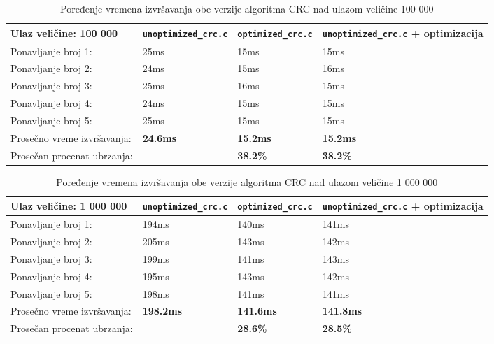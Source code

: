 \documentclass[12pt,oneside]{memoir}
\begin{document}
\begin{table}[!ht]
\begin{center}
\begin{tabular}{ | m{5.5cm} | m{2.7cm}| m{2.5cm} | m{2.7cm} | }
      \hline
     Ulaz veličine: 100 000 & \texttt{unoptimized}\-\texttt{\_crc.c} & \texttt{optimized}\-\texttt{\_crc.c} & \texttt{unoptimized}\-\texttt{\_crc.c} + optimizacija\\ 
      \hline
      Ponavljanje broj 1: & 25ms & 15ms & 15ms\\
      \hline
      Ponavljanje broj 2: & 24ms & 15ms & 16ms\\
      \hline
      Ponavljanje broj 3: & 25ms & 16ms & 15ms\\
      \hline
      Ponavljanje broj 4: & 24ms & 15ms & 15ms\\
      \hline
      Ponavljanje broj 5: & 25ms & 15ms & 15ms\\
      \hline
      Prosečno vreme izvršavanja: & \textbf{24.6ms} & \textbf{15.2ms} & \textbf{15.2ms}\\
      \hline
      Prosečan procenat ubrzanja: &  & \textbf{38.2\%} & \textbf{38.2\%} \\
      \hline
\end{tabular}
\end{center}
\caption{Poređenje vremena izvršavanja obe verzije algoritma CRC nad ulazom veličine 100 000}
\label{table_100k}
\end{table}

\begin{table}[!ht]
\begin{center}
\begin{tabular}{ | m{5.5cm} | m{2.5cm}| m{2.5cm} | m{2.5cm} |  }
      \hline
     Ulaz veličine: 1 000 000 & \texttt{unoptimized}\-\texttt{\_crc.c} & \texttt{optimized}\-\texttt{\_crc.c} & \texttt{unoptimized}\-\texttt{\_crc.c} + optimizacija\\ 
      \hline
      Ponavljanje broj 1: & 194ms & 140ms & 141ms\\
      \hline
      Ponavljanje broj 2: & 205ms & 143ms & 142ms\\
      \hline
      Ponavljanje broj 3: & 199ms & 141ms &  143ms\\
      \hline
      Ponavljanje broj 4: & 195ms & 143ms & 142ms\\
      \hline
      Ponavljanje broj 5: & 198ms & 141ms & 141ms\\
      \hline
      Prosečno vreme izvršavanja: & \textbf{198.2ms} & \textbf{141.6ms} & \textbf{141.8ms}\\
      \hline
      Prosečan procenat ubrzanja: & & \textbf{28.6\%} & \textbf{28.5\%} \\
      \hline
\end{tabular}
\end{center}
\caption{Poređenje vremena izvršavanja obe verzije algoritma CRC nad ulazom veličine 1 000 000}
\label{table_1m}
\end{table}
\end{document}
